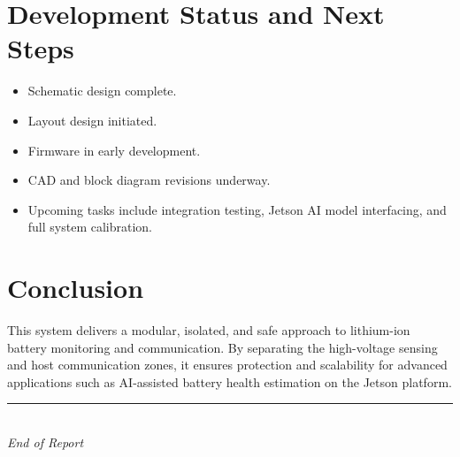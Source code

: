 \documentclass[12pt,a4paper]{article}
\begin{document}
\section{Development Status and Next Steps}
\begin{itemize}
    \item Schematic design complete.
    \item Layout design initiated.
    \item Firmware in early development.
    \item CAD and block diagram revisions underway.
    \item Upcoming tasks include integration testing, Jetson AI model interfacing, and full system calibration.
\end{itemize}

\section{Conclusion}
This system delivers a modular, isolated, and safe approach to lithium-ion battery monitoring and communication. By separating the high-voltage sensing and host communication zones, it ensures protection and scalability for advanced applications such as AI-assisted battery health estimation on the Jetson platform.

\vfill
\begin{center}
    \rule{0.7\linewidth}{0.4pt} \\[0.2cm]
    \textit{End of Report}
\end{center}
\end{document}

